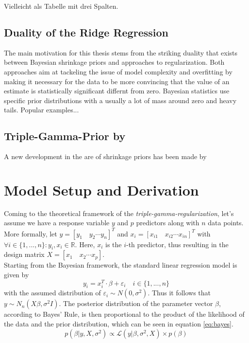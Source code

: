 \documentclass[12pt,a4paper]{article}
\begin{document}
Vielleicht als Tabelle mit drei Spalten.

\subsection{Duality of the Ridge Regression}

The main motivation for this thesis stems from the striking duality that exists between Bayesian shrinkage priors and approaches to regularization. Both approaches aim at tackeling the issue of model complexity and overfitting by making it necessary for the data to be more convincing that the value of an estimate is statistically significant differnt from zero. Bayesian statistics use specific prior distributions with a usually a lot of mass around zero and heavy tails. Popular examples...  

\subsection{Triple-Gamma-Prior by \textcite{TGP2020}}
A new development in the are of shrinkage priors has been made by \textcite{TGP2020}

\newpage
\section{Model Setup and Derivation}
Coming to the theoretical framework of the \textit{triple-gamma-regularization}, let's assume we have a response variable $y$ and $p$ predictors along with $n$ data points. More formally, let $y=[y_1  \quad y_2 \cdots y_n]^T$ and $x_i = [x_{i1} \quad x_{i2} \cdots x_{in}]^T$ with $\forall i\in \{1,...,n\}: y_i, x_i \in \mathbb{R}$. Here, $x_i$ is the $i$-th predictor, thus resulting in the design matrix $X = [x_1 \quad x_2 \cdots x_p]$. \\

Starting from the Bayesian framework, the standard linear regression model is given by
\[
y_i = x_i^T\cdot \beta + \varepsilon_i \quad i\in \{1,...,n\} 
\]
with the assumed distribution of $\varepsilon_i \sim N(0,\sigma^2)$. Thus it follows that $y\sim N_n(X\beta,\sigma^2I)$. The posterior distribution of the parameter vector $\beta$, according to Bayes' Rule, is then proportional to the product of the likelihood of the data and the prior distribution, which can be seen in equation \ref{eq:bayes}.
\begin{equation}\label{eq:bayes}
p(\beta|y, X, \sigma^2) \propto \mathcal{L}(y|\beta, \sigma^2, X)\times p(\beta)
\end{equation}	
\end{document}
